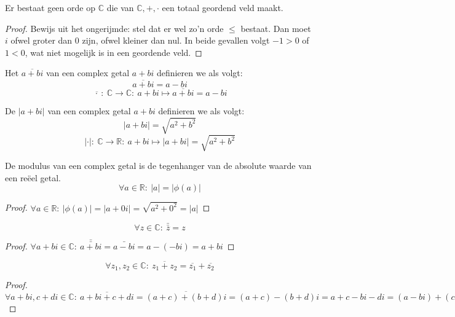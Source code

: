 \documentclass[main.tex]{subfiles}
\begin{document}
\begin{pr}
  Er bestaat geen orde op $\mathbb{C}$ die van $\mathbb{C},+,\cdot$ een totaal geordend veld maakt.

  \begin{proof}
    Bewijs uit het ongerijmde: stel dat er wel zo'n orde $\le$ bestaat.
    Dan moet $i$ ofwel groter dan $0$ zijn, ofwel kleiner dan nul.
    In beide gevallen volgt $-1 > 0$ of $1 < 0$, wat niet mogelijk is in een geordende veld.
  \end{proof}
\end{pr}

\begin{de}
  Het  $\overline{a+bi}$ van een complex getal $a+bi$ definieren we als volgt:
  \[ \overline{a+bi} = a-bi \]
  \[ \overline{\, \cdot\ }:\ \mathbb{C} \rightarrow \mathbb{C}:\ a+bi \mapsto \overline{a+bi} = a-bi \]
\end{de}

\begin{de}
  De  $|a+bi|$ van een complex getal $a+bi$ definieren we als volgt:
  \[ |a+bi| = \sqrt{a^{2}+b^{2}} \]
  \[ |\cdot|:\ \mathbb{C} \rightarrow \mathbb{R}:\ a+bi \mapsto |a+bi| = \sqrt{a^{2}+b^{2}} \]
\end{de}

\begin{ei}
  De modulus van een complex getal is de tegenhanger van de absolute waarde van een re\"eel getal.
  \[ \forall a \in \mathbb{R}:\ |a| = |\phi(a)| \]
  \begin{proof}
    $\forall a\in \mathbb{R}:\ |\phi(a)| = |a+0i| = \sqrt{a^{2} + 0^{2}} = |a|$
  \end{proof}
\end{ei}

\begin{pr}
  \[ \forall z\in \mathbb{C}:\ \bar{\bar{z}} = z \]

  \begin{proof}
    $\forall a+bi\in \mathbb{C}:\ \bar{\bar{a+bi}} = \bar{a-bi} = a-(-bi) = a+bi$
  \end{proof}
\end{pr}

\begin{pr}
  \label{pr:modulus-door-optelling}
  \[ \forall z_{1},z_{2}\in \mathbb{C}:\ \overline{z_{1}+z_{2}} = \overline{z_{1}} + \overline{z_{2}} \]

  \begin{proof}
    $\forall a+bi,c+di \in \mathbb{C}:\ \overline{a+bi + c+di} = \overline{(a+c)+(b+d)i} =(a+c)-(b+d)i = a+c-bi-di = (a-bi) + (c-di)$
  \end{proof}
\end{pr}
\end{document}
